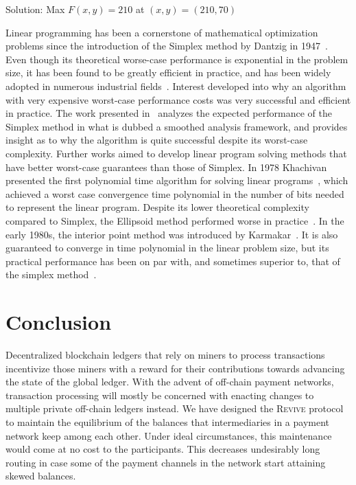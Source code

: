 \documentclass[sigconf]{acmart}
\newcommand{\name}{\textsc{Revive}\xspace}
\begin{document}
Solution: Max $F(x, y) = 210$ at $(x, y) = (210, 70)$

Linear programming has been a cornerstone of mathematical optimization problems since the introduction of the Simplex method by Dantzig in 1947~\cite{dantzig1990origins}. Even though its theoretical worse-case performance is exponential in the problem size, it has been found to be greatly efficient in practice, and has been widely adopted in numerous industrial fields~\cite{spielman2004smoothed}.
Interest developed into why an algorithm with very expensive worst-case performance costs was very successful and efficient in practice. The work presented in~\cite{spielman2004smoothed} analyzes the expected performance of the Simplex method in what is dubbed a smoothed analysis framework, and provides insight as to why the algorithm is quite successful despite its worst-case complexity.
Further works aimed to develop linear program solving methods that have better worst-case guarantees than those of Simplex. In 1978 Khachivan presented the first polynomial time algorithm for solving linear programs~\cite{khachiyan1980polynomial}, which achieved a worst case convergence time polynomial in the number of bits needed to represent the linear program. Despite its lower theoretical complexity compared to Simplex, the Ellipsoid method performed worse in practice~\cite{spielman2004smoothed}.
In the early 1980s, the interior point method was introduced by Karmakar~\cite{karmarkar1984new}. It is also guaranteed to converge in time polynomial in the linear problem size, but its practical performance has been on par with, and sometimes superior to, that of the simplex method~\cite{spielman2004smoothed}.


\section{Conclusion}
\label{sec:conclusion}
Decentralized blockchain ledgers that rely on miners to process transactions incentivize those miners with a reward for their contributions towards advancing the state of the global ledger. With the advent of off-chain payment networks, transaction processing will mostly be concerned with enacting changes to multiple private off-chain ledgers instead.
We have designed the \name protocol to maintain the equilibrium of the balances that intermediaries in a payment network keep among each other. Under ideal circumstances, this maintenance would come at no cost to the participants. This decreases undesirably long routing in case some of the payment channels in the network start attaining skewed balances.
\end{document}
